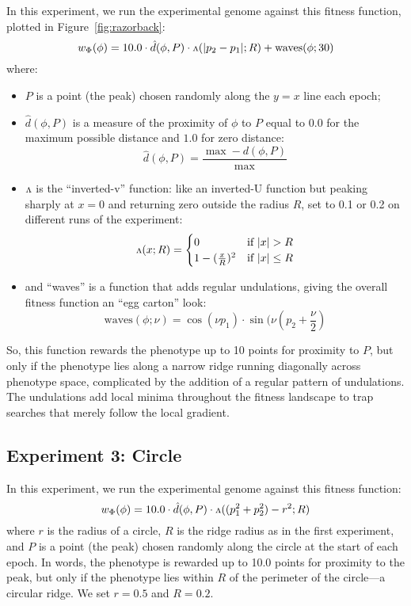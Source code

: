 \documentclass[letterpaper]{article}
\newcommand{\invv}{\ensuremath{\rotatebox[origin=c]{180}{\textrm{v}}}\xspace}
\begin{document}
In this experiment, we run the experimental genome against this fitness
function, plotted in Figure~\ref{fig:razorback}:
\[
   w_\Phi(\phi) = 10.0 \cdot \hat{d}(\phi, P)
                       \cdot \invv(|p_2 - p_1|; R)
                       + \text{waves}(\phi; 30)
\]
where:
\begin{itemize}
  \item[ ]
    $P$ is a point (the peak) chosen randomly along the $y=x$ line each epoch;

  \item[ ]
$\hat{d}(\phi, P)$ is a measure of the proximity of $\phi$ to $P$ equal to
$0.0$ for the maximum possible distance and $1.0$ for zero distance:
\[
  \hat{d}(\phi, P) = \frac{\max - d(\phi, P)}{\max}
\]

  \item[ ]
    \invv is the ``inverted-v'' function: like an inverted-U function but
    peaking sharply at $x=0$ and returning zero outside the radius $R$, set to
    0.1 or 0.2 on different runs of the experiment:
\[
   \invv(x; R) =
   \begin{cases}
      0 & \text{if } |x|>R \\
      1 - (\frac{x}{R})^2 &
      \text{if } |x|\leq R
   \end{cases}
\]

  \item[ ]
    and ``waves'' is a function that adds regular undulations, giving the
    overall fitness function an ``egg carton'' look:
\[
  \text{waves}(\phi; \nu) = \cos(\nu p_1)
                            \cdot
                            \sin(\nu (p_2 + \frac{\nu}{2})
\]
\end{itemize}

So, this function rewards the phenotype up to 10 points for proximity to
$P$, but only if the phenotype lies along a narrow ridge running diagonally
across phenotype space, complicated by the addition of a regular pattern of
undulations. The undulations add local minima throughout the fitness
landscape to trap searches that merely follow the local gradient.

\subsection{Experiment 3: Circle}

In this experiment, we run the experimental genome against this fitness
function:
\[
  w_\Phi(\phi) = 10.0 \cdot \hat{d}(\phi, P)
                      \cdot \invv((p_1^2 + p_2^2) - r^2; R)
\]
where $r$ is the radius of a circle, $R$ is the ridge radius as in the first
experiment, and $P$ is a point (the peak) chosen randomly along the circle
at the start of each epoch. In words, the phenotype is rewarded up to 10.0
points for proximity to the peak, but only if the phenotype lies within $R$
of the perimeter of the circle---a circular ridge. We set $r=0.5$ and $R=0.2$.
\end{document}
